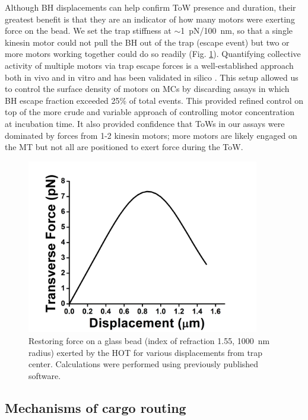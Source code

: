 Although BH displacements can help confirm ToW presence and duration, their greatest benefit is that they are an indicator of how many motors were exerting force on the bead. We set the trap stiffness at $\sim$\SI{1}{\pico\newton}/\SI{100}{\nano\meter}, so that a single kinesin motor could not pull the BH out of the trap (escape event) but two or more motors working together could do so readily (Fig. \ref{fig:BHforce}). Quantifying collective activity of multiple motors via trap escape forces is a well-established approach both in vivo \cite{Ashkin1990,Gross2002} and in vitro \cite{McKenney2010} and has been validated in silico \cite{McKenney2010}. This setup allowed us to control the surface density of motors on MCs by discarding assays in which BH escape fraction exceeded 25\% of total events. This provided refined control on top of the more crude and variable approach of controlling motor concentration at incubation time. It also provided confidence that ToWs in our assays were dominated by forces from 1-2 kinesin motors; more motors are likely engaged on the MT but not all are positioned to exert force during the ToW.

\begin{figure}
\centering
\includegraphics[width=4in]{FvsL}
\caption[Restoring force on Bead Handles]{Restoring force on a glass bead (index of refraction 1.55, \SI{1000}{\nano\meter} radius) exerted by the HOT for various displacements from trap center. Calculations were performed using previously published software\cite{Nahmias2002}.}
\label{fig:BHforce}
\end{figure}

\subsection{Mechanisms of cargo routing}

